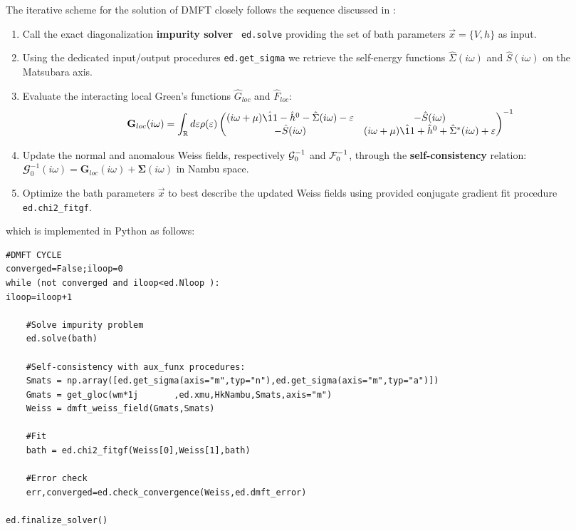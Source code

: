 \documentclass[edipack2.tex]{subfiles}
\begin{document}
The iterative scheme for the solution of DMFT closely follows the
sequence discussed in :   
\begin{enumerate}
\item Call the exact diagonalization {\bf impurity solver} {\tt
    ed.solve} providing the set of bath parameters $\vec{x}=\{V,h\}$  as input. 
\item Using the dedicated
  input/output procedures {\tt ed.get\_sigma} we retrieve the self-energy functions  
  $\hat{\Sigma}(i\omega)$ and $\hat{S}(i\omega)$ on the 
  Matsubara axis.
\item
  Evaluate the interacting local Green's functions $\hat{G}_{loc}$ and
  $\hat{F}_{loc}$:
  \begin{equation}
  {\mathbf G}_{loc}(i\omega) =
  \int_\RRR d\e \rho(\e)
  \begin{pmatrix}
    (i\omega +\mu)\hat{\11} - \hat{h}^0 - \hat{\Sigma}(i\omega) -\e & -\hat{S}(i\omega) \\
    -\hat{S}(i\omega) & (i\omega +\mu)\hat{\11} + \hat{h}^0 +
    \hat{\Sigma}^*(i\omega) +\e\\
  \end{pmatrix}^{-1}
\end{equation}
\item Update the normal and anomalous Weiss fields, respectively 
  ${\cal G}_0^{-1}$ and ${\cal F}_0^{-1}$, through the {\bf self-con\-sis\-ten\-cy}
    relation: $\mathbfcal{G}^{-1}_0(i\omega) = {\mathbf G}_{loc}(i\omega) +
    {\mathbf \Sigma}(i\omega)$ in Nambu space. 
  \item Optimize the bath parameters $\vec{x}$ to best describe the  updated
    Weiss fields using \NAME provided conjugate gradient  fit
    procedure {\tt ed.chi2\_fitgf}.
\end{enumerate}
which is implemented in Python as follows:
\begin{lstlisting}[style=mypython,numbers=none,basicstyle={\scriptsize\ttfamily}]
#DMFT CYCLE
converged=False;iloop=0
while (not converged and iloop<ed.Nloop ):
iloop=iloop+1

    #Solve impurity problem
    ed.solve(bath)
    
    #Self-consistency with aux_funx procedures:
    Smats = np.array([ed.get_sigma(axis="m",typ="n"),ed.get_sigma(axis="m",typ="a")])    
    Gmats = get_gloc(wm*1j       ,ed.xmu,HkNambu,Smats,axis="m") 
    Weiss = dmft_weiss_field(Gmats,Smats)                  
          
    #Fit
    bath = ed.chi2_fitgf(Weiss[0],Weiss[1],bath)

    #Error check
    err,converged=ed.check_convergence(Weiss,ed.dmft_error)

ed.finalize_solver()
\end{lstlisting}
\end{document}
